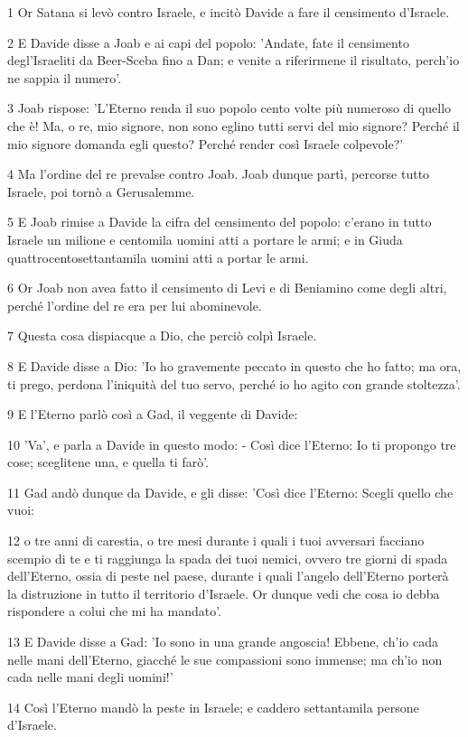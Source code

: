 \par 1 Or Satana si levò contro Israele, e incitò Davide a fare il censimento d'Israele.
\par 2 E Davide disse a Joab e ai capi del popolo: 'Andate, fate il censimento degl'Israeliti da Beer-Sceba fino a Dan; e venite a riferirmene il risultato, perch'io ne sappia il numero'.
\par 3 Joab rispose: 'L'Eterno renda il suo popolo cento volte più numeroso di quello che è! Ma, o re, mio signore, non sono eglino tutti servi del mio signore? Perché il mio signore domanda egli questo? Perché render così Israele colpevole?'
\par 4 Ma l'ordine del re prevalse contro Joab. Joab dunque partì, percorse tutto Israele, poi tornò a Gerusalemme.
\par 5 E Joab rimise a Davide la cifra del censimento del popolo: c'erano in tutto Israele un milione e centomila uomini atti a portare le armi; e in Giuda quattrocentosettantamila uomini atti a portar le armi.
\par 6 Or Joab non avea fatto il censimento di Levi e di Beniamino come degli altri, perché l'ordine del re era per lui abominevole.
\par 7 Questa cosa dispiacque a Dio, che perciò colpì Israele.
\par 8 E Davide disse a Dio: 'Io ho gravemente peccato in questo che ho fatto; ma ora, ti prego, perdona l'iniquità del tuo servo, perché io ho agito con grande stoltezza'.
\par 9 E l'Eterno parlò così a Gad, il veggente di Davide:
\par 10 'Va', e parla a Davide in questo modo: - Così dice l'Eterno: Io ti propongo tre cose; sceglitene una, e quella ti farò'.
\par 11 Gad andò dunque da Davide, e gli disse: 'Così dice l'Eterno: Scegli quello che vuoi:
\par 12 o tre anni di carestia, o tre mesi durante i quali i tuoi avversari facciano scempio di te e ti raggiunga la spada dei tuoi nemici, ovvero tre giorni di spada dell'Eterno, ossia di peste nel paese, durante i quali l'angelo dell'Eterno porterà la distruzione in tutto il territorio d'Israele. Or dunque vedi che cosa io debba rispondere a colui che mi ha mandato'.
\par 13 E Davide disse a Gad: 'Io sono in una grande angoscia! Ebbene, ch'io cada nelle mani dell'Eterno, giacché le sue compassioni sono immense; ma ch'io non cada nelle mani degli uomini!'
\par 14 Così l'Eterno mandò la peste in Israele; e caddero settantamila persone d'Israele.
